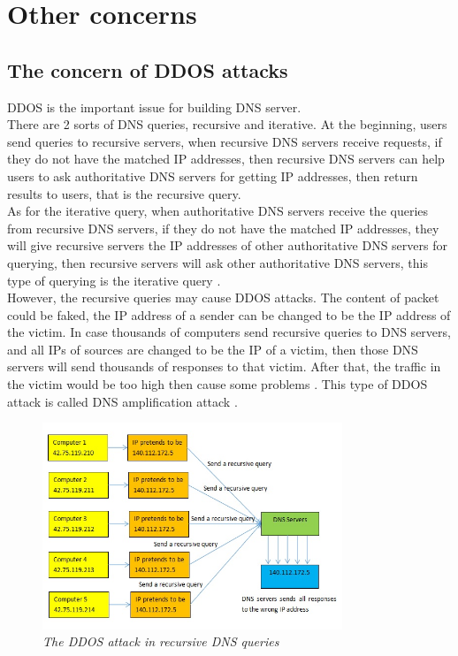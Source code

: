 \chapter{Other concerns}
\section{The concern of DDOS attacks}

DDOS is the important issue for building DNS server.
\\

There are 2 sorts of DNS queries, recursive and iterative. At the beginning, users send queries to recursive servers, when recursive DNS servers receive requests, if they do not have the matched IP addresses, then recursive DNS servers can help users to ask authoritative DNS servers for getting IP addresses, then return results to users, that is the recursive query. 
\\

As for the iterative query, when authoritative DNS servers receive the queries from recursive DNS servers, if they do not have the matched IP addresses, they will give recursive servers the IP addresses of other authoritative DNS servers for querying, then recursive servers will ask other authoritative DNS servers, this type of querying is the iterative query \cite{What_is_recursive_DNS}.
\\

However, the recursive queries may cause DDOS attacks. The content of packet could be faked, the IP address of a sender can be changed to be the IP address of the victim. In case thousands of computers send recursive queries to DNS servers, and all IPs of sources are changed to be the IP of a victim, then those DNS servers will send thousands of responses to that victim. After that, the traffic in the victim would be too high then cause some problems  \cite{Why_recursive_dns_not_recommended_video}. This type of DDOS attack is called DNS amplification attack \cite{DNS_amplification}.
\\

\begin{figure}[hbt!]  
    \centering
    \includegraphics[width=0.8\textwidth]{figure/recursive-query-ddos.jpg}
    \caption{\em The DDOS attack in recursive DNS queries \cite{Why_recursive_dns_not_recommended_video} \label{fig:DDOS_attack}}
\end{figure}

